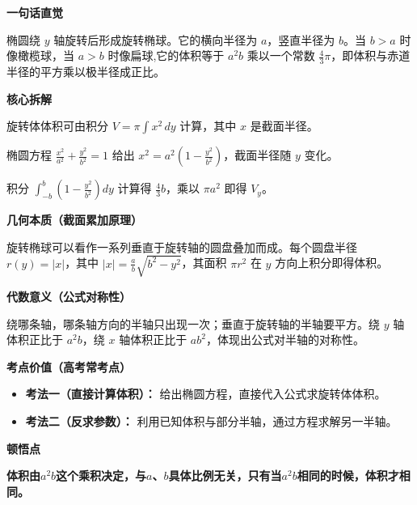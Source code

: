 \begin{explanationbox}

	\textbf{\textcolor{CExplanation}{一句话直觉}}

	椭圆绕  $y$ 轴旋转后形成旋转椭球。它的横向半径为 $a$，竖直半径为 $b$。当 $b>a$ 时像橄榄球，当 $a>b$ 时像扁球,它的体积等于 $a^2 b$ 乘以一个常数 $\frac{4}{3}\pi$，即体积与赤道半径的平方乘以极半径成正比。

	\medskip
	\textbf{\textcolor{CExplanation}{核心拆解}}
	\begin{description}[style=nextline, leftmargin=2.8em, labelsep=0.5em, itemsep=0.45em]
		\item[\textbf{要点一（旋转体体积公式）：}] 旋转体体积可由积分 $V=\pi\int x^2\,dy$ 计算，其中 $x$ 是截面半径。
		\item[\textbf{要点二（椭圆与半径关系）：}] 椭圆方程 $\frac{x^2}{a^2}+\frac{y^2}{b^2}=1$ 给出 $x^2=a^2\left(1-\frac{y^2}{b^2}\right)$，截面半径随 $y$ 变化。
		\item[\textbf{要点三（定积分与常数）：}] 积分 $\int_{-b}^{b}\left(1-\frac{y^2}{b^2}\right)dy$ 计算得 $\frac{4}{3}b$，乘以 $\pi a^2$ 即得 $V_y$。
	\end{description}

	\medskip
	\textbf{\textcolor{CExplanation}{几何本质（截面累加原理）}}

	旋转椭球可以看作一系列垂直于旋转轴的圆盘叠加而成。每个圆盘半径 $r(y)=|x|$，其中 $|x|=\frac{a}{b}\sqrt{b^2-y^2}$，其面积 $\pi r^2$ 在 $y$ 方向上积分即得体积。

	\medskip
	\textbf{\textcolor{CExplanation}{代数意义（公式对称性）}}

	绕哪条轴，哪条轴方向的半轴只出现一次；垂直于旋转轴的半轴要平方。绕 $y$ 轴体积正比于 $a^2b$，绕 $x$ 轴体积正比于 $ab^2$，体现出公式对半轴的对称性。

	\medskip
	\textbf{\textcolor{CExplanation}{考点价值（高考常考点）}}

	\begin{itemize}[leftmargin=*, itemsep=0.5em, topsep=0.4em]
		\item \textbf{考法一（直接计算体积）：} 给出椭圆方程，直接代入公式求旋转体体积。
		\item \textbf{考法二（反求参数）：} 利用已知体积与部分半轴，通过方程求解另一半轴。
	\end{itemize}

	\medskip
	\textbf{\textcolor{CExplanation}{顿悟点}}

	\textbf{体积由$a^2b$这个乘积决定，与$a$、$b$具体比例无关，只有当$a^2b$相同的时候，体积才相同。}


\end{explanationbox}
